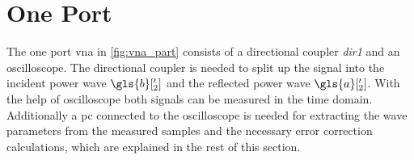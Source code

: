 \documentclass[12pt,a4paper,parskip=full,abstract=true,BCOR=12mm]{scrreprt}
\def\device#1{\mbox{\textit{#1}}}
\begin{document}

\section{One Port }
\label{sec:vna}

The one port \gls{vna} in \cref{fig:vna_part} consists of a directional coupler
\device{dir1} and an oscilloscope. The directional coupler is needed to split up
the signal into the incident power wave $\gls{b}['_{2}]$ and the reflected power
wave $\gls{a}['_{2}]$. With the help of oscilloscope both signals can be measured in the
time domain. Additionally a \gls{pc} connected to the oscilloscope is needed
for extracting the wave parameters from the measured samples and the necessary
error correction calculations, which are explained in the rest of this section.
\end{document}
